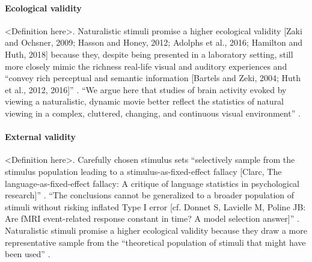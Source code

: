\paragraph{Ecological validity}
<Definition here>.
Naturalistic stimuli promise a higher ecological validity [Zaki and Ochsner,
2009; Hasson and Honey, 2012; Adolphs et al., 2016; Hamilton and Huth, 2018]
because they, despite being presented in a laboratory setting, still more
closely mimic the richness real-life visual and auditory experiences
\citep{hasson2004intersubject, haxby2020naturalistic} 
%
and ``convey rich perceptual and semantic information [Bartels and Zeki, 2004;
Huth et al., 2012, 2016]'' \citep{nastase2019measuring}.
%
``We argue here that studies of brain activity evoked by viewing a naturalistic,
dynamic movie better reflect the statistics of natural viewing in a complex,
cluttered, changing, and continuous visual environment''
\citep{haxby2020naturalistic}.

\paragraph{External validity}
<Definition here>.
Carefully chosen stimulus sets ``selectively sample from the stimulus population
leading to a stimulus-as-fixed-effect fallacy [Clarc, The
language-as-fixed-effect fallacy: A critique of language statistics in
psychological research]'' \citep{westfall2016fixing}.
%
``The conclusions cannot be generalized to a broader population of stimuli
without risking inflated Type I error  [cf. Donnet S, Lavielle M, Poline JB: Are
fMRI event-related response constant in time? A model selection
answer]'' \citep{westfall2016fixing}.
%
Naturalistic stimuli promise a higher ecological validity because they draw a
more representative sample from the ``theoretical population of stimuli that
might have been used'' \citep{westfall2016fixing}.


